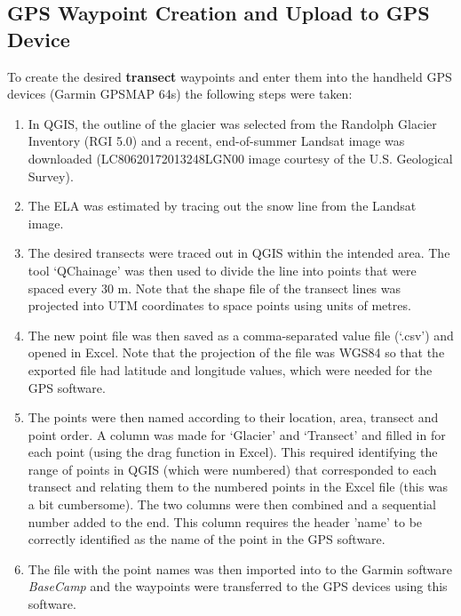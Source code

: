 \documentclass{sfuthesis}
\begin{document}
%
%
%
%
%

\backmatter%
	
	

\begin{appendices} 

	\chapter{GPS Waypoint Creation and Upload to GPS Device}
	
	To create the desired \textbf{transect} waypoints and enter them into the handheld GPS devices (Garmin GPSMAP 64s) the following steps were taken:
\begin{enumerate}
\item In QGIS, the outline of the glacier was selected from the Randolph Glacier Inventory (RGI 5.0) \citep{Pfeffer2014} and a recent, end-of-summer Landsat image was downloaded (LC80620172013248LGN00 image courtesy of the U.S. Geological Survey). 
\item The ELA was estimated by tracing out the snow line from the Landsat image.
\item The desired transects were traced out in QGIS within the intended area. The tool `QChainage' was then used to divide the line into points that were spaced every 30 m. Note that the shape file of the transect lines was projected into UTM coordinates to space points using units of metres. 
\item The new point file was then saved as a comma-separated value file (`.csv') and opened in Excel. Note that the projection of the file was WGS84 so that the exported file had latitude and longitude values, which were needed for the GPS software.
\item The points were then named according to their location, area, transect and point order. A column was made for `Glacier' and `Transect' and filled in for each point (using the drag function in Excel). This required identifying the range of points in QGIS (which were numbered) that corresponded to each transect and relating them to the numbered points in the Excel file (this was a bit cumbersome). The two columns were then combined and a sequential number added to the end. This column requires the header 'name' to be correctly identified as the name of the point in the GPS software.
\item The file with the point names was then imported into to the Garmin software \textit{BaseCamp} and the waypoints were transferred to the GPS devices using this software. 
\end{enumerate}


\end{appendices}
\end{document}
